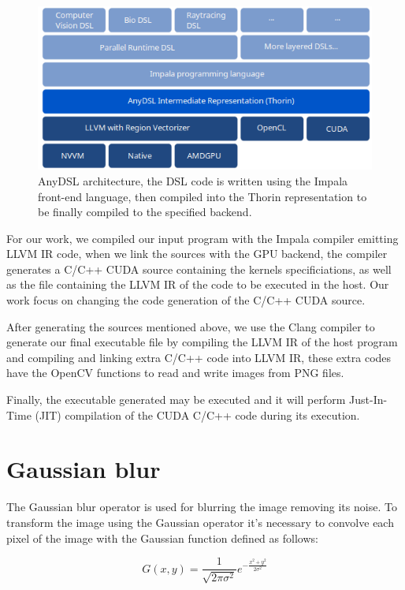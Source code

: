 \documentclass{article}
\begin{document}
\begin{figure}[!htb]
\centering
\includegraphics[width=13cm]{anydsl_architecture.png}
\caption{AnyDSL architecture, the DSL code is written using the Impala front-end language, then compiled into the Thorin representation to be finally compiled to the specified backend.}
\label{fig:anydsl_architecture}
\end{figure}

For our work, we compiled our input program with the Impala compiler emitting LLVM IR code, when we link the sources with the GPU backend, the compiler generates a C/C++ CUDA source containing the kernels specificiations, as well as the file containing the LLVM IR of the code to be executed in the host. Our work focus on changing the code generation of the C/C++ CUDA source.

After generating the sources mentioned above, we use the Clang compiler to generate our final executable file by compiling the LLVM IR of the host program and compiling and linking extra C/C++ code into LLVM IR, these extra codes have the OpenCV \cite{opencv} functions to read and write images from PNG files.

Finally, the executable generated may be executed and it will perform Just-In-Time (JIT) compilation of the CUDA C/C++ code during its execution.

\section{Gaussian blur}
The Gaussian blur operator is used for blurring the image removing its noise. To transform the image using the Gaussian operator it's necessary to convolve each pixel of the image with the Gaussian function defined as follows:

\begin{equation*}
    G(x,y) = \frac{1}{\sqrt{2\pi\sigma^2}}e^{-\frac{x^2 + y^2}{2\sigma^2}}
\end{equation*}
\end{document}
